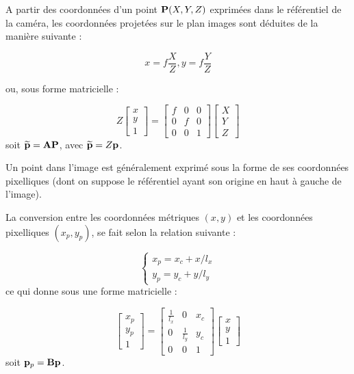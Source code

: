 A partir des coordonnées d'un point ${\bf P}(X, Y, Z)$ exprimées dans le référentiel de la caméra, les coordonnées projetées sur le plan images sont déduites de la manière suivante :

\begin{equation}
x = f \frac{X}{Z}, y = f \frac{Y}{Z}
\label{intro:eq12}
\end{equation}

ou, sous forme matricielle :

\begin{equation}
Z
\begin{bmatrix}
x \\y \\ 1
\end{bmatrix}
=
\begin{bmatrix}
f & 0 & 0 \\ 0 & f & 0 \\ 0 & 0 & 1 
\end{bmatrix}
\begin{bmatrix}
X \\ Y \\ Z 
\end{bmatrix}
\label{intro:eq13}
\end{equation}
soit $\widetilde {\bf p} = {\bf A}{\bf P}$, avec $\widetilde {\bf p} = Z {\bf p}$.

Un point dans l'image est généralement exprimé sous la forme de ses coordonnées pixelliques (dont on suppose le référentiel ayant son origine en haut à gauche de l'image).

La conversion entre les coordonnées métriques $(x, y)$ et les coordonnées pixelliques $(x_p, y_p)$, se fait selon la relation suivante :

\begin{equation}
\left \lbrace
\begin{matrix}
x_p = x_c + x/l_x \\
y_p = y_c + y/l_y
\end{matrix} \right .
\label{intro:eq14}
\end{equation}
ce qui donne sous une forme matricielle :

\begin{equation}
\begin{bmatrix}
x_p \\y_p \\ 1
\end{bmatrix}
=
\begin{bmatrix}
\frac 1 {l_x} & 0 & x_c \\ 0 & \frac 1 {l_y} & y_c \\ 0 & 0 & 1 
\end{bmatrix}
\begin{bmatrix}
x \\ y \\ 1
\end{bmatrix}
\label{intro:eq15}
\end{equation}
soit ${\bf p}_p = {\bf B} {\bf p}$.

